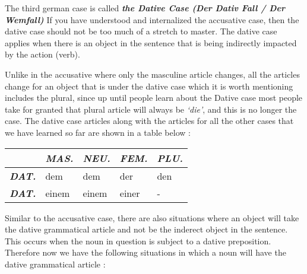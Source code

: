 \documentclass[a4paper,twocolumn,10pt]{article}
\newcommand{\newpar}
{\par \vspace{0.3cm}}
\begin{document}
The third german case is called \textbf{\textit{the Dative Case (Der Dativ Fall
		/ Der Wemfall)}} If you have understood and internalized the accusative
case, then the dative case should not be too much of a stretch to master. The
dative case applies when there is an object in the sentence that is being
indirectly impacted by the action (verb).\newpar

Unlike in the accusative where only the masculine article changes, all the
articles change for an object that is  under the dative case which it is worth
mentioning includes the plural, since up until people learn about the Dative
case most people take for granted that plural article will always be
\textit{`die'}, and this is no longer the case. The dative case articles along
with the articles for all the other cases that we have learned so far are shown
in a table below :\newpar


\vspace{0.5cm}

\nolinenumbers

\begin{tabularx}{0.94\linewidth}{l|XXXX}

		&
		\cellcolor{lightgray} \textbf{\textit{MAS.}} &
		\cellcolor{lightgray} \textbf{\textit{NEU.}}  &
		\cellcolor{lightgray} \textbf{\textit{FEM.}}  &
		\cellcolor{lightgray} \textbf{\textit{PLU.}} \\

		\midrule

		\cellcolor{lightgray} \textbf{\textit{DAT.}} &
		\cellcolor{cell-lightred} dem               &
		\cellcolor{cell-lightred} dem               &
		\cellcolor{cell-lightpurple} der               &
		\cellcolor{cell-lightgreen} den \\

		\midrule

		\cellcolor{lightgray} \textbf{\textit{DAT.}} &
		\cellcolor{cell-lightred} einem              &
		\cellcolor{cell-lightred} einem              &
		\cellcolor{cell-lightpurple} einer           &
		\cellcolor{table-bg} - \\

\end{tabularx}

\vspace{0.5cm}

\linenumbers


Similar to the accusative case, there are also situations where an object will
take the dative grammatical article and not be the inderect object in the
sentence. This occurs when the noun in question is subject to a dative
preposition. Therefore now we have the following situations in which a noun will
have the dative grammatical article :\newpar
\end{document}
